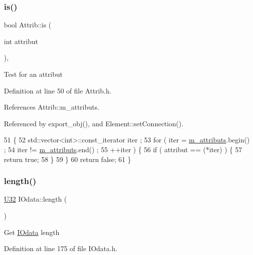 \subsubsection{\texorpdfstring{is()}{is()}}
{\footnotesize\ttfamily bool Attrib\+::is (\begin{DoxyParamCaption}\item[{int}]{attribut }\end{DoxyParamCaption})\hspace{0.3cm}{\ttfamily [inline]}, {\ttfamily [inherited]}}

Test for an attribut 

Definition at line 50 of file Attrib.\+h.



References Attrib\+::m\+\_\+attributs.



Referenced by export\+\_\+obj(), and Element\+::set\+Connection().


\begin{DoxyCode}
51   \{
52     std::vector<int>::const\_iterator iter ;
53     \textcolor{keywordflow}{for} ( iter  = \hyperlink{classAttrib_ac4bd58a0cc6b38a3b711d609a3d3aacc}{m\_attributs}.begin() ;
54           iter != \hyperlink{classAttrib_ac4bd58a0cc6b38a3b711d609a3d3aacc}{m\_attributs}.end()   ;
55           ++iter ) \{
56       \textcolor{keywordflow}{if} ( attribut == (*iter) ) \{
57         \textcolor{keywordflow}{return} \textcolor{keyword}{true};
58       \}
59     \}
60     \textcolor{keywordflow}{return} \textcolor{keyword}{false};
61   \}
\end{DoxyCode}
\mbox{\label{classIOdata_abb40e71ce0290832a24857b4a1e7b1a3}} 
\subsubsection{\texorpdfstring{length()}{length()}}
{\footnotesize\ttfamily \hyperlink{classIOdata_a96fb57f5fcd87b708743abd3c86a5198}{U32} I\+Odata\+::length (\begin{DoxyParamCaption}{ }\end{DoxyParamCaption})\hspace{0.3cm}{\ttfamily [inline]}}

Get \hyperlink{classIOdata}{I\+Odata} length 

Definition at line 175 of file I\+Odata.\+h.



